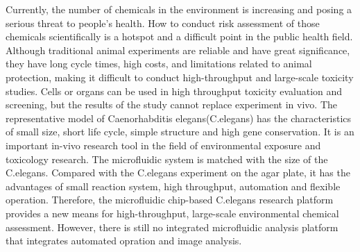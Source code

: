 \begin{englishabstract}
	Currently, the number of chemicals in the environment is increasing and posing a serious threat to people's health. 
	How to conduct risk assessment of those chemicals scientifically is a hotspot and a difficult point in the public health field.
	Although traditional animal experiments are reliable and have great significance, 
	they have long cycle times, high costs, and limitations related to animal protection, 
	making it difficult to conduct high-throughput and large-scale toxicity studies.
	Cells or organs can be used  in  high throughput toxicity evaluation and screening,
	but the results of the study cannot replace experiment in vivo.
	The representative model of  Caenorhabditis elegans(C.elegans) has the characteristics of small size,
	short life cycle, simple structure and high gene conservation. 
	It is an important in-vivo research tool in the field of environmental exposure and toxicology research.
	The microfluidic system is matched with the size of the C.elegans. 
	Compared with the C.elegans experiment on the agar plate, 
	it has the advantages of small reaction system, high throughput, automation and flexible operation.
	Therefore, the microfluidic chip-based C.elegans research platform provides a new means for high-throughput,
	large-scale environmental chemical assessment. However, 
	there is still no integrated microfluidic analysis platform that
	integrates automated opration and image analysis.


\end{englishabstract}
